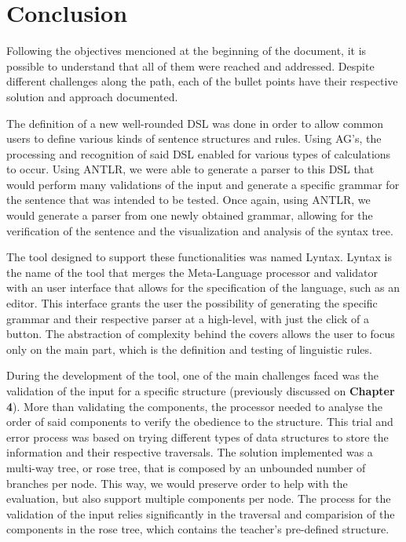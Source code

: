\chapter{Conclusion} \label{conclusion}

Following the objectives mencioned at the beginning of the document, it is possible to understand that all of them were reached and addressed.
Despite different challenges along the path, each of the bullet points have their respective solution and approach documented.

The definition of a new well-rounded DSL was done in order to allow common users to define various kinds of sentence structures and rules.
Using AG's, the processing and recognition of said DSL enabled for various types of calculations to occur.
Using ANTLR, we were able to generate a parser to this DSL that would perform many validations of the input and generate a specific grammar for the sentence that was
intended to be tested.
Once again, using ANTLR, we would generate a parser from one newly obtained grammar, allowing for the verification of the sentence and the visualization and analysis
of the syntax tree.

The tool designed to support these functionalities was named Lyntax. Lyntax is the name of the tool that merges the Meta-Language processor and validator with an
user interface that allows for the specification of the language, such as an editor.
This interface grants the user the possibility of generating the specific grammar and their respective parser at a high-level, with just the click of a button.
The abstraction of complexity behind the covers allows the user to focus only on the main part, which is the definition and testing of linguistic rules.

During the development of the tool, one of the main challenges faced was the validation of the input for a specific structure (previously discussed on \textbf{Chapter 4}).
More than validating the components, the processor needed to analyse the order of said components to verify the obedience to the structure.
This trial and error process was based on trying different types of data structures to store the information and their respective traversals.
The solution implemented was a multi-way tree, or rose tree, that is composed by an unbounded number of branches per node.
This way, we would preserve order to help with the evaluation, but also support multiple components per node.
The process for the validation of the input relies significantly in the traversal and comparision of the components in the rose tree, 
which contains the teacher's pre-defined structure. 


